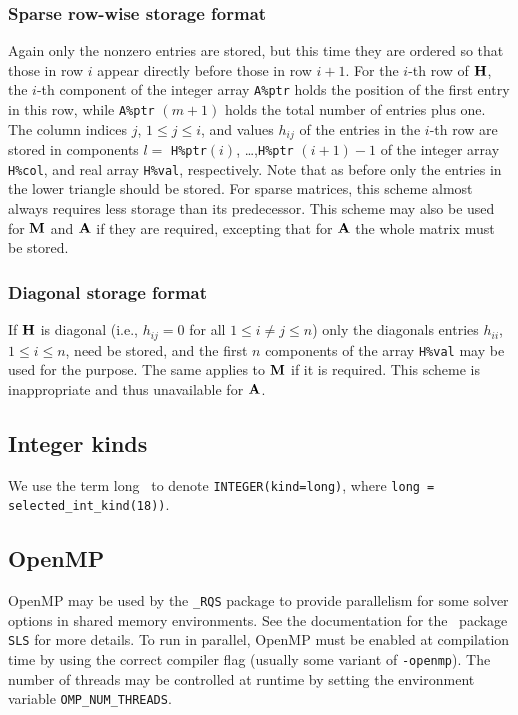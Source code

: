 \documentclass{galahad}
\newcommand{\packagename}{RQS}
\newcommand{\fullpackagename}{\libraryname\_\packagename}
\begin{document}
\subsubsection{Sparse row-wise storage format}\label{rowwise}
Again only the nonzero entries are stored, but this time
they are ordered so that those in row $i$ appear directly before those
in row $i+1$. For the $i$-th row of ${\mathbf{H}}$, the $i$-th component of the
integer array {\tt A\%ptr} holds the position of the first entry in this row,
while {\tt A\%ptr} $(m+1)$ holds the total number of entries plus one.
The column indices $j$, $1 \leq j \leq i$, and values $h_{ij}$ of the
entries in the $i$-th row are stored in components
$l =$ {\tt H\%ptr}$(i)$, \ldots ,{\tt H\%ptr} $(i+1)-1$ of the
integer array {\tt H\%col}, and real array {\tt H\%val}, respectively.
Note that as before only the entries in the lower triangle should be stored.
For sparse matrices, this scheme almost always requires less storage than
its predecessor.
This scheme may also be used for ${\mathbf{M}}$ and ${\mathbf{A}}$ if they are required,
excepting that for ${\mathbf{A}}$ the whole matrix must be stored.

\subsubsection{Diagonal storage format}\label{diagonal}
If ${\mathbf{H}}$ is diagonal (i.e., $h_{ij} = 0$ for all $1 \leq i \neq j \leq n$)
only the diagonals entries $h_{ii}$, $1 \leq i \leq n$,  need be stored,
and the first $n$ components of the array {\tt H\%val} may be used for
the purpose. The same applies to ${\mathbf{M}}$ if it is required.
This scheme is inappropriate and thus unavailable for ${\mathbf{A}}$.

\subsection{Integer kinds}\label{Integer kinds}
We use the term
long \integer\ to denote {\tt INTEGER\-(kind=long)}, where
{\tt long = selected\_int\_kind(18))}.


\subsection{OpenMP}
OpenMP may be used by the {\tt \fullpackagename} package to provide
parallelism for some solver options in shared memory environments.
See the documentation for the \galahad\ package {\tt SLS} for more details.
To run in parallel, OpenMP
must be enabled at compilation time by using the correct compiler flag
(usually some variant of {\tt -openmp}).
The number of threads may be controlled at runtime
by setting the environment variable {\tt OMP\_NUM\_THREADS}.
\end{document}
